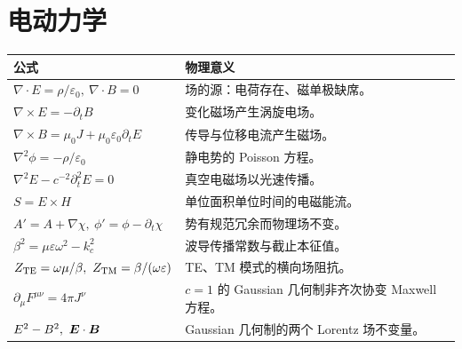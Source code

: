 \section{电动力学}
\begin{longtable}{p{}p{}}\toprule
公式&物理意义\\\midrule\endhead
$\nabla\cdot E=\rho/\varepsilon_0,\ \nabla\cdot B=0$&场的源：电荷存在、磁单极缺席。\\
$\nabla\times E=-\partial_tB$&变化磁场产生涡旋电场。\\
$\nabla\times B=\mu_0J+\mu_0\varepsilon_0\partial_tE$&传导与位移电流产生磁场。\\
$\nabla^2\phi=-\rho/\varepsilon_0$&静电势的 Poisson 方程。\\
$\nabla^2E-c^{-2}\partial_t^2E=0$&真空电磁场以光速传播。\\
$S=E\times H$&单位面积单位时间的电磁能流。\\
$A'=A+\nabla\chi,\ \phi'=\phi-\partial_t\chi$&势有规范冗余而物理场不变。\\
$\beta^2=\mu\varepsilon\omega^2-k_c^2$&波导传播常数与截止本征值。\\
$Z_{\rm TE}=\omega\mu/\beta,\ Z_{\rm TM}=\beta/(\omega\varepsilon)$&TE、TM 模式的横向场阻抗。\\
$\partial_\mu F^{\mu\nu}=4\pi J^\nu$&$c=1$ 的 Gaussian 几何制非齐次协变 Maxwell 方程。\\
$E^2-B^2,\ \bm{E}\cdot\bm{B}$&Gaussian 几何制的两个 Lorentz 场不变量。\\\bottomrule
\end{longtable}

